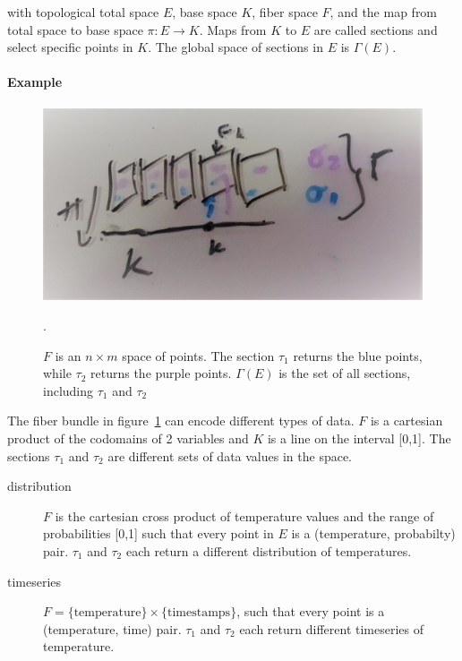 \documentclass[../main.tex]{subfiles}
\begin{document}
with topological total space $E$, base space $K$, fiber space $F$, and the map from total space to base space $\pi: E \rightarrow K$. Maps from $K$ to $E$ are called sections and select specific points in $K$. The global space of sections in $E$ is $\Gamma(E)$.

\paragraph{Example}

\begin{figure}[H]
    \label{fig:data_fiber_bundle}
    \includegraphics[width=1\linewidth]{figures/sections/math/fiberbundle.png}
    \caption{$F$ is an $n\times m$ space of points. The section $\tau_1$ returns the blue points,  while $\tau_2$ returns the purple points. $\Gamma(E)$ is the set of all sections, including $\tau_1$ and $\tau_2$}.  
\end{figure}

The fiber bundle in figure~\ref{fig:data_fiber_bundle} can encode different types of data. $F$ is a cartesian product of the codomains of 2 variables and $K$ is a line on the interval [0,1]. The sections $\tau_{1}$ and $\tau_{2}$ are different sets of data values in the space. 

\begin{description}
    \item[distribution] $F$ is the cartesian cross product of temperature values and the range of probabilities [0,1] such that every point in $E$ is a (temperature, probabilty) pair. $\tau_1$ and $\tau_2$ each return a different distribution of temperatures. 
    \item[timeseries]  $F = \{\text{temperature}\} \times \{\text{timestamps}\}$, such that every point is a (temperature, time) pair. $\tau_1$ and $\tau_2$ each return different timeseries of temperature.
\end{description}
\end{document}
